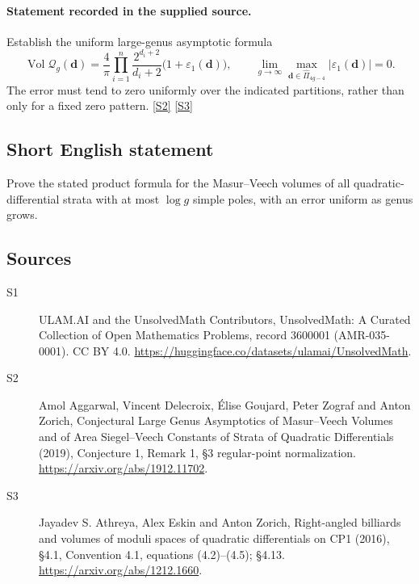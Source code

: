 \documentclass[11pt]{article}
\newcommand{\sref}[2]{\hyperlink{source:#1:#2}{[S#2]}}
\begin{document}
\paragraph{Statement recorded in the supplied source.}
Establish the uniform large-genus asymptotic formula
\[
\operatorname{Vol}\mathcal Q_g(\boldsymbol d)
 =\frac4\pi\prod_{i=1}^{n}\frac{2^{d_i+2}}{d_i+2}\bigl(1+\varepsilon_1(\boldsymbol d)\bigr),\qquad
\lim_{g\to\infty}\max_{\boldsymbol d\in\widehat\Pi_{4g-4}}|\varepsilon_1(\boldsymbol d)|=0.
\]
The error must tend to zero uniformly over the indicated partitions, rather than only for a fixed zero pattern. \sref{3600001}{2} \sref{3600001}{3}
\subsection{Short English statement}
Prove the stated product formula for the Masur--Veech volumes of all quadratic-differential strata with at most $\log g$ simple poles, with an error uniform as genus grows.
\subsection{Sources}
\begin{description}
\item[\hypertarget{source:3600001:1}{S1}] ULAM.AI and the UnsolvedMath Contributors, UnsolvedMath: A Curated Collection of Open Mathematics Problems, record 3600001 (AMR-035-0001). CC BY 4.0. \url{https://huggingface.co/datasets/ulamai/UnsolvedMath}.
\item[\hypertarget{source:3600001:2}{S2}] Amol Aggarwal, Vincent Delecroix, Élise Goujard, Peter Zograf and Anton Zorich, Conjectural Large Genus Asymptotics of Masur–Veech Volumes and of Area Siegel–Veech Constants of Strata of Quadratic Differentials (2019), Conjecture 1, Remark 1, §3 regular-point normalization. \url{https://arxiv.org/abs/1912.11702}.
\item[\hypertarget{source:3600001:3}{S3}] Jayadev S. Athreya, Alex Eskin and Anton Zorich, Right-angled billiards and volumes of moduli spaces of quadratic differentials on CP1 (2016), §4.1, Convention 4.1, equations (4.2)–(4.5); §4.13. \url{https://arxiv.org/abs/1212.1660}.
\end{description}
\label{end:3600001}
\end{document}
